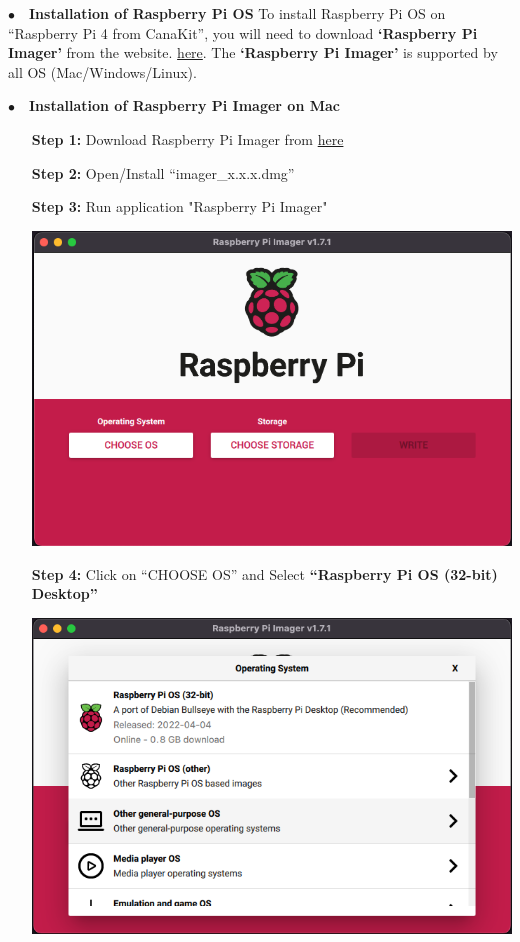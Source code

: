 \noindent$\bullet$~~\textbf{Installation of Raspberry Pi OS}	\label{sec:run-raspberry}
	To install Raspberry Pi OS on ``Raspberry Pi 4 from CanaKit'', you will need to download \textbf{`Raspberry Pi Imager'} from the website. \href{https://www.raspberrypi.com/software}{here}. The \textbf{`Raspberry Pi Imager'} is supported by all OS (Mac/Windows/Linux). 
	
\noindent$\bullet$~~\textbf{Installation of Raspberry Pi Imager on Mac}
		\begin{itemize}[leftmargin=1.7cm]
			\item[\textbf{Step 1:}] Download Raspberry Pi Imager from \href{https://downloads.raspberrypi.org/imager/imager_latest.dmg}{here}
			\item[\textbf{Step 2:}] Open/Install ``imager\_x.x.x.dmg''
			\item[\textbf{Step 3:}] Run application "Raspberry Pi Imager"\\
				\begin{minipage}{\textwidth}
					\vspace{2mm}
					\includegraphics[scale=0.29]{Images/raspberry_pi/app.png}
					\vspace{2mm}
				\end{minipage}
			\item[\textbf{Step 4:}] Click on ``CHOOSE OS'' and Select \textbf{``Raspberry Pi OS (32-bit) Desktop''}\\
				\begin{minipage}{\textwidth}
					\vspace{2mm}
					\includegraphics[scale=0.29]{Images/raspberry_pi/choose-os.png}

\end{minipage}
\end{itemize}
